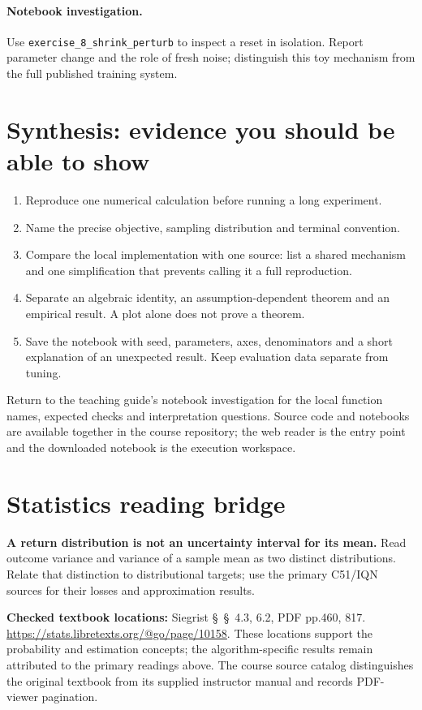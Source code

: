 \documentclass[11pt]{scrartcl}
\begin{document}
\paragraph{Notebook investigation.} Use \texttt{exercise\_8\_shrink\_perturb} to inspect a reset in isolation. Report parameter change and the role of fresh noise; distinguish this toy mechanism from the full published training system.

\section*{Synthesis: evidence you should be able to show}
\begin{enumerate}
\item Reproduce one numerical calculation before running a long experiment.
\item Name the precise objective, sampling distribution and terminal convention.
\item Compare the local implementation with one source: list a shared mechanism
and one simplification that prevents calling it a full reproduction.
\item Separate an algebraic identity, an assumption-dependent theorem and an
empirical result. A plot alone does not prove a theorem.
\item Save the notebook with seed, parameters, axes, denominators and a short
explanation of an unexpected result. Keep evaluation data separate from tuning.
\end{enumerate}
Return to the teaching guide's notebook investigation for the local function
names, expected checks and interpretation questions. Source code and notebooks
are available together in the course repository; the web reader is the entry
point and the downloaded notebook is the execution workspace.
\section*{Statistics reading bridge}
\textbf{A return distribution is not an uncertainty interval for its mean.} Read outcome variance and variance of a sample mean as two distinct distributions. Relate that distinction to distributional targets; use the primary C51/IQN sources for their losses and approximation results.

\textbf{Checked textbook locations:} Siegrist \S~\S~4.3, 6.2, PDF pp.460, 817. \url{https://stats.libretexts.org/@go/page/10158}. These locations support the probability and estimation concepts; the algorithm-specific results remain attributed to the primary readings above. The course source catalog distinguishes the original textbook from its supplied instructor manual and records PDF-viewer pagination.
\end{document}
